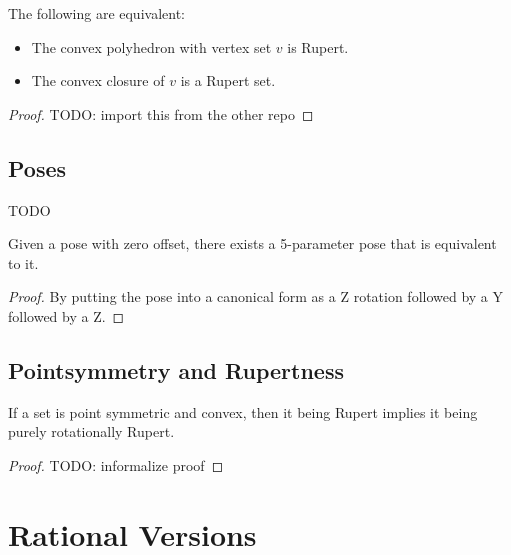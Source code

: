 \begin{theorem}
\label{thm:rupert_iff_rupert_set}
\leanok
The following are equivalent:
\begin{itemize}
\item The convex polyhedron with vertex set $v$ is Rupert.
\item The convex closure of $v$ is a Rupert set.
\end{itemize}
\end{theorem}
\begin{proof}
\leanok
TODO: import this from the other repo
\end{proof}


\section{Poses}

TODO

\begin{theorem}
\label{thm:pose_of_matrix_pose}
\leanok
Given a pose with zero offset, there exists a 5-parameter pose that is equivalent to it.
\end{theorem}

\begin{proof}
By putting the pose into a canonical form as a Z rotation followed by a Y followed by a Z.
\leanok
\end{proof}

\section{Pointsymmetry and Rupertness}

\begin{theorem}
\label{thm:rupert_implies_rot_rupert}
\leanok
If a set is point symmetric and convex, then it being Rupert implies
it being purely rotationally Rupert.
\end{theorem}

\begin{proof}
\leanok
TODO: informalize proof
\end{proof}




\chapter{Rational Versions}

